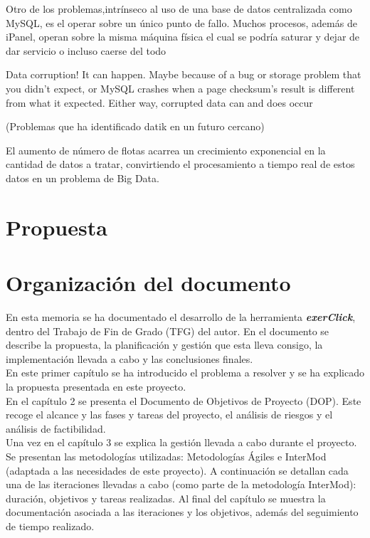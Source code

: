 Otro de los problemas,intrínseco al uso de una base de datos centralizada como MySQL, es el operar sobre un único punto de fallo. Muchos procesos, además de iPanel, operan sobre la misma máquina física el cual se podría saturar y dejar de dar servicio o incluso caerse del todo

Data corruption! It can happen. Maybe because of a bug or storage problem that you didn’t expect, or MySQL crashes when a page checksum’s result is different from what it expected. Either way, corrupted data can and does occur

(Problemas que ha identificado datik en un futuro cercano)

El aumento de número de flotas acarrea un crecimiento exponencial en la cantidad de datos a tratar, convirtiendo el procesamiento a tiempo real de estos datos en un problema  de Big Data. 

\section{Propuesta}



\section{Organización del documento}

En esta memoria se ha documentado  el desarrollo de la herramienta \textbf{\textit{exerClick}}, dentro del Trabajo de Fin de Grado (TFG) del autor. En el documento se describe la propuesta, la planificación y gestión que esta lleva consigo, la implementación llevada a cabo y las conclusiones finales.\\

En este primer capítulo se ha introducido el problema a resolver y se ha explicado la propuesta presentada en este proyecto.\\

En el capítulo 2 se presenta el Documento de Objetivos de Proyecto (DOP). Este recoge el alcance y las fases y tareas del proyecto, el análisis de riesgos y el análisis de factibilidad.\\

Una vez en el capítulo 3 se explica la gestión llevada a cabo durante el proyecto. Se presentan las metodologías utilizadas: Metodologías Ágiles e InterMod (adaptada a las necesidades de este proyecto). A continuación se detallan cada una de las iteraciones llevadas a cabo (como parte de la metodología InterMod): duración, objetivos y tareas realizadas. Al final del capítulo se muestra la documentación asociada a las iteraciones y los objetivos, además del seguimiento de tiempo realizado.\\

